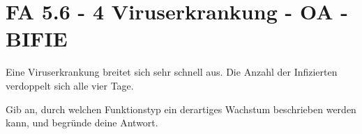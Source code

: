 \section{FA 5.6 - 4 Viruserkrankung - OA - BIFIE}

\begin{beispiel}[FA 5.6]{1} %
Eine Viruserkrankung breitet sich sehr schnell aus. Die Anzahl der Infizierten verdoppelt sich alle vier Tage. 
\leer

Gib an, durch welchen Funktionstyp ein derartiges Wachstum beschrieben werden kann, und begründe deine Antwort.

\end{beispiel}